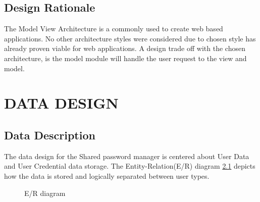 \documentclass[letterpaper,12pt,oneside,listof=totoc]{scrreprt}
\begin{document}
\section{Design Rationale}
The Model View Architecture is a commonly used to create web based applications. No other architecture styles were considered due to chosen style has already proven viable for web applications. A design trade off with the chosen architecture, is the model module will handle the user request to the view and model.  


\chapter{DATA DESIGN}
\section{Data Description}
The data design for the Shared password manager is centered about User Data and User Credential data storage. 
The Entity-Relation(E/R) diagram \ref{arch} depicts how the data is stored and logically separated between user types.


\begin{figure}
\centering
{}
\caption{E/R diagram}
\label{arch}
\end{figure}
\end{document}
